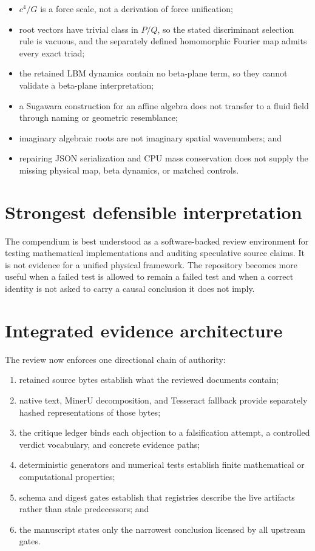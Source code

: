 \begin{itemize}
  \item $c^4/G$ is a force scale, not a derivation of force unification;
  \item root vectors have trivial class in $P/Q$, so the stated discriminant
    selection rule is vacuous, and the separately defined homomorphic Fourier
    map admits every exact triad;
  \item the retained LBM dynamics contain no beta-plane term, so they cannot
    validate a beta-plane interpretation;
  \item a Sugawara construction for an affine algebra does not transfer to a
    fluid field through naming or geometric resemblance;
  \item imaginary algebraic roots are not imaginary spatial wavenumbers; and
  \item repairing JSON serialization and CPU mass conservation does not supply
    the missing physical map, beta dynamics, or matched controls.
\end{itemize}

\section{Strongest defensible interpretation}

The compendium is best understood as a software-backed review environment for
testing mathematical implementations and auditing speculative source claims.
It is not evidence for a unified physical framework. The repository becomes
more useful when a failed test is allowed to remain a failed test and when a
correct identity is not asked to carry a causal conclusion it does not imply.

\section{Integrated evidence architecture}

The review now enforces one directional chain of authority:

\begin{enumerate}
  \item retained source bytes establish what the reviewed documents contain;
  \item native text, MinerU decomposition, and Tesseract fallback provide
    separately hashed representations of those bytes;
  \item the critique ledger binds each objection to a falsification attempt,
    a controlled verdict vocabulary, and concrete evidence paths;
  \item deterministic generators and numerical tests establish finite
    mathematical or computational properties;
  \item schema and digest gates establish that registries describe the live
    artifacts rather than stale predecessors; and
  \item the manuscript states only the narrowest conclusion licensed by all
    upstream gates.
\end{enumerate}

